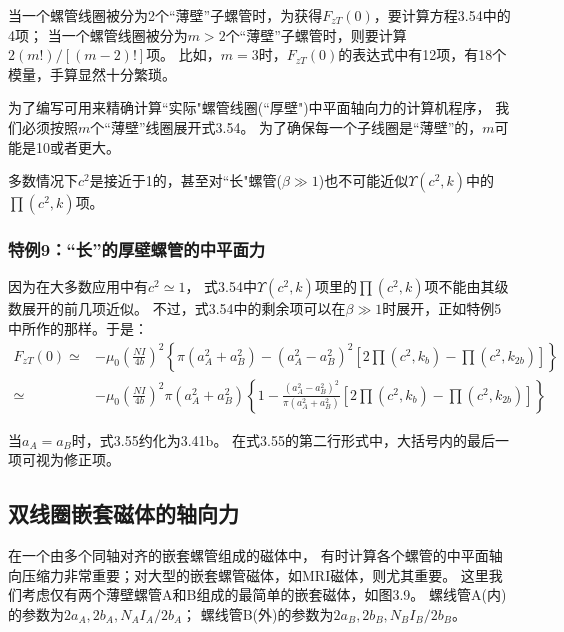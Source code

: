 当一个螺管线圈被分为2个``薄壁''子螺管时，为获得$F_{zT}(0)$，要计算方程3.54中的4项；
当一个螺管线圈被分为$m>2$个``薄壁''子螺管时，则要计算$2(m!)/[(m−2)!]$项。
比如，$m=3$时，$F_{zT}(0)$的表达式中有12项，有18个模量，手算显然十分繁琐。

为了编写可用来精确计算``实际"螺管线圈(``厚壁")中平面轴向力的计算机程序，
我们必须按照$m$个``薄壁''线圈展开式3.54。
为了确保每一个子线圈是``薄壁''的，$m$可能是10或者更大。

多数情况下$c^2$是接近于1的，甚至对``长"螺管($\beta\gg 1$)也不可能近似$\Upsilon(c^2,k)$中的$\prod(c^2,k)$项。

\subsubsection{特例9：``长''的厚壁螺管的中平面力}
因为在大多数应用中有$c^2\simeq 1$，
式3.54中$\Upsilon(c^2,k)$项里的$\prod{(c^2,k)}$项不能由其级数展开的前几项近似。
不过，式3.54中的剩余项可以在$\beta \gg 1$时展开，正如特例5中所作的那样。于是：
\begin{equation}
\begin{split}
F_{zT}(0)\simeq& -\mu_0 \left(\frac{N I}{4b}\right)^2\left\{ \pi(a_A^2+a_B^2)-(a_A^2-a_B^2)^2[2\prod(c^2,k_b)-\prod(c^2,k_{2b})]\right\}  \\
\simeq& -\mu_0 \left(\frac{N I}{4b}\right)^2 \pi(a_A^2+a_B^2) \left\{1-\frac{(a_A^2-a_B^2)^2}{\pi(a_A^2+a_B^2)}[2\prod(c^2,k_b)-\prod(c^2,k_{2b})]\right\}
\end{split}
\end{equation}

当$a_A=a_B$时，式3.55约化为3.41b。
在式3.55的第二行形式中，大括号内的最后一项可视为修正项。

\subsection{双线圈嵌套磁体的轴向力}
在一个由多个同轴对齐的嵌套螺管组成的磁体中，
有时计算各个螺管的中平面轴向压缩力非常重要；对大型的嵌套螺管磁体，如MRI磁体，则尤其重要。
这里我们考虑仅有两个薄壁螺管A和B组成的最简单的嵌套磁体，如图3.9。
螺线管A(内)的参数为$2a_A,2b_A,N_A I_A/2b_A$；
螺线管B(外)的参数为$2a_B, 2b_B, N_B I_B/2b_B$。

